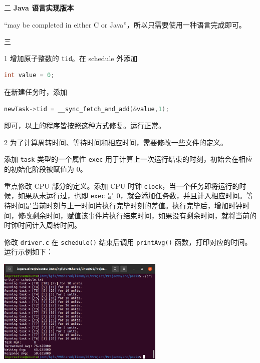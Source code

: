 \documentclass[12pt,a4paper]{article}
\newenvironment{problems}{\begin{list}{}{\renewcommand{\makelabel}[1]{\textbf{##1}\hfil}}}{\end{list}}
\newenvironment{steps}{\begin{list}{}{\renewcommand{\makelabel}[1]{##1.\hfil}}}{\end{list}}
\providecommand{\code}[2]{}
\begin{document}
\begin{problems}
\begin{steps}
    \end{steps}
    \item[二] \textbf{Java 语言实现版本}
    
    ``may be completed in either C or Java''，所以只需要使用一种语言完成即可。
    
    \item[三] 
    \begin{steps}
        \item[1] 增加原子整数的 \verb"tid"。在 schedule 外添加
        \begin{lstlisting}[language=c]
            int value = 0;
        \end{lstlisting} 
        在新建任务时，添加
        \begin{lstlisting}[language=c]
            newTask->tid = __sync_fetch_and_add(&value,1);
        \end{lstlisting}
        即可，以上的程序皆按照这种方式修复。运行正常。

        \item[2] 为了计算周转时间、等待时间和相应时间，需要修改一些文件的定义。
         
        添加 \verb"task" 类型的一个属性 \verb"exec" 用于计算上一次运行结束的时刻，初始会在相应的初始化阶段被赋值为 0。
        
        \code{src/posix/task.h}{c}

        重点修改 CPU 部分的定义。添加 CPU 时钟 \verb"clock"，当一个任务即将运行的时候，如果从未运行过，也即 \verb"exec" 是 0，就会添加任务数，并且计入相应时间。等待时间是当前时刻与上一时间片执行完毕时刻的差值。执行完毕后，增加时钟时间，修改剩余时间，赋值该事件片执行结束时间，如果没有剩余时间，就将当前的时钟时间计入周转时间。

        \code{src/posix/cpu.c}{c}

        修改 \verb"driver.c" 在 \verb"schedule()" 结束后调用 \verb"printAvg()" 函数，打印对应的时间。运行示例如下：

        \includegraphics[width=0.6\textwidth]{avg.png}


\end{steps}
\end{problems}
\end{document}

